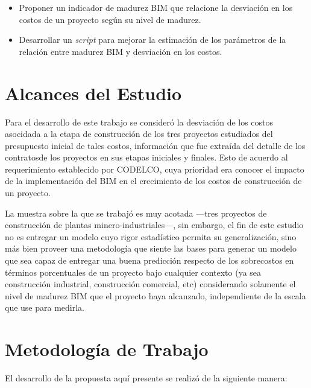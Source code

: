 \begin{itemize}
    \item Proponer un indicador de madurez BIM que relacione la desviación en los costos de un proyecto según su nivel de madurez.
    \item Desarrollar un \emph{script} para mejorar la estimación de los parámetros de la relación entre madurez BIM y desviación en los costos.
\end{itemize}

\section{Alcances del Estudio}

Para el desarrollo de este trabajo se consideró la desviación de los costos asocidada a la etapa de construcción de los tres proyectos estudiados del presupuesto inicial de tales costos, información que fue extraída del detalle de los contratosde los proyectos en sus etapas iniciales y finales. Esto de acuerdo al requerimiento establecido por CODELCO, cuya prioridad era conocer el impacto de la implementación del BIM en el crecimiento de los costos de construcción de un proyecto.

La muestra sobre la que se trabajó es muy acotada ---tres proyectos de construcción de plantas minero-industriales---, sin embargo, el fin de este estudio no es entregar un modelo cuyo rigor estadístico permita su generalización, sino más bien proveer una metodología que siente las bases para generar un modelo que sea capaz de entregar una buena predicción respecto de los sobrecostos en términos porcentuales de un proyecto bajo cualquier contexto (ya sea construcción industrial, construcción comercial, etc) considerando solamente el nivel de madurez BIM que el proyecto haya alcanzado, independiente de la escala que use para medirla.



\section{Metodología de Trabajo}

El desarrollo de la propuesta aquí presente se realizó de la siguiente manera:

